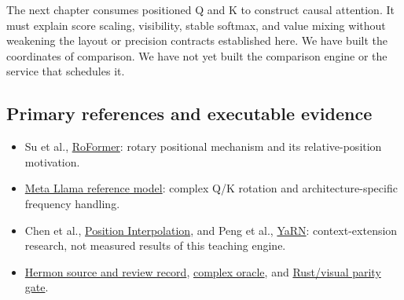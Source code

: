 The next chapter consumes positioned Q and K to construct causal
attention. It must explain score scaling, visibility, stable softmax,
and value mixing without weakening the layout or precision contracts
established here. We have built the coordinates of comparison. We have
not yet built the comparison engine or the service that schedules it.

\subsection{Primary references and executable
evidence}\label{primary-references-and-executable-evidence}

\begin{itemize}
\tightlist
\item
  Su et al., \href{https://arxiv.org/html/2104.09864v5}{RoFormer}:
  rotary positional mechanism and its relative-position motivation.
\item
  \href{https://raw.githubusercontent.com/meta-llama/llama-models/main/models/llama3/model.py}{Meta
  Llama reference model}: complex Q/K rotation and architecture-specific
  frequency handling.
\item
  Chen et al., \href{https://arxiv.org/abs/2306.15595}{Position
  Interpolation}, and Peng et al.,
  \href{https://arxiv.org/abs/2309.00071}{YaRN}: context-extension
  research, not measured results of this teaching engine.
\item
  \href{https://github.com/hermonai/inside-the-llm-engine/blob/astra-visual-rewrite/research/part-02/chapter-09-position-rope.md}{Hermon
  source and review record},
  \href{https://github.com/hermonai/inside-the-llm-engine/blob/astra-visual-rewrite/code/reference/python/chapter09_rope_oracle.py}{complex
  oracle}, and
  \href{https://github.com/hermonai/inside-the-llm-engine/blob/astra-visual-rewrite/scripts/check-rope-visual-parity.py}{Rust/visual
  parity gate}.
\end{itemize}

